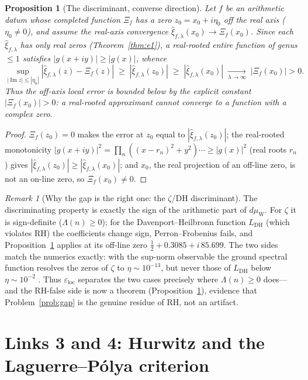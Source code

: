 \documentclass[11pt]{amsart}
\newtheorem{proposition}[theorem]{Proposition}
\theoremstyle{definition}
\theoremstyle{remark}
\newtheorem{remark}[theorem]{Remark}
\newcommand{\RH}{\mathrm{RH}}
\newcommand{\xih}{\widehat{\xi}}
\newcommand{\Lam}{\Lambda}
\DeclareMathOperator{\Imag}{Im}
\begin{document}
\begin{proposition}[The discriminant, converse direction]\label{prop:dh}
Let $f$ be an arithmetic datum whose completed function $\Xi_f$ has a zero
$z_0=x_0+i\eta_0$ off the real axis ($\eta_0\neq0$), and assume the real-axis
convergence $\xih_{f,\lambda}(x_0)\to\Xi_f(x_0)$. Since each
$\xih_{f,\lambda}$ has only real zeros (Theorem~\ref{thm:e1}), a real-rooted
entire function of genus $\leq1$ satisfies $|g(x+iy)|\geq|g(x)|$, whence
\[
\sup_{|\Imag z|\leq|\eta_0|}|\xih_{f,\lambda}(z)-\Xi_f(z)|
\;\geq\;|\xih_{f,\lambda}(z_0)|\;\geq\;|\xih_{f,\lambda}(x_0)|
\;\xrightarrow[\lambda\to\infty]{}\;|\Xi_f(x_0)|>0 .
\]
Thus the off-axis local error is bounded below by the explicit constant
$|\Xi_f(x_0)|>0$: a real-rooted approximant cannot converge to a function with
a complex zero.
\end{proposition}
\begin{proof}
$\Xi_f(z_0)=0$ makes the error at $z_0$ equal to $|\xih_{f,\lambda}(z_0)|$;
the real-rooted monotonicity $|g(x+iy)|^2=\prod_n((x-r_n)^2+y^2)\cdots\geq
|g(x)|^2$ (real roots $r_n$) gives
$|\xih_{f,\lambda}(z_0)|\geq|\xih_{f,\lambda}(x_0)|$; and $x_0$, the real
projection of an off-line zero, is not an on-line zero, so $\Xi_f(x_0)\neq0$.
\end{proof}

\begin{remark}[Why the gap is the right one: the $\zeta$/DH discriminant]
\label{rem:dh}
The discriminating property is exactly the sign of the arithmetic part of
$d\mu_{\mathrm{W}}$. For $\zeta$ it is sign-definite ($\Lam(n)\geq0$); for the
Davenport--Heilbronn function $L_{\mathrm{DH}}$ (which violates $\RH$) the
coefficients change sign, Perron--Frobenius fails, and Proposition~\ref{prop:dh}
applies at its off-line zero $\tfrac12+0.3085+i\,85.699$. The two sides match
the numerics exactly: with the sup-norm observable the ground spectral
function resolves the zeros of $\zeta$ to $\eta\sim10^{-13}$, but never those
of $L_{\mathrm{DH}}$ below $\eta\sim10^{-2}$ \cite{Pccm}. Thus
$\varepsilon_{\mathrm{loc}}$ separates the two cases precisely where
$\Lam(n)\geq0$ does---and the RH-false side is now a theorem
(Proposition~\ref{prop:dh}), evidence that Problem~\ref{prob:gap} is the
genuine residue of $\RH$, not an artifact.
\end{remark}

\section{Links 3 and 4: Hurwitz and the Laguerre--P\'olya criterion}\label{sec:e34}
\end{document}
